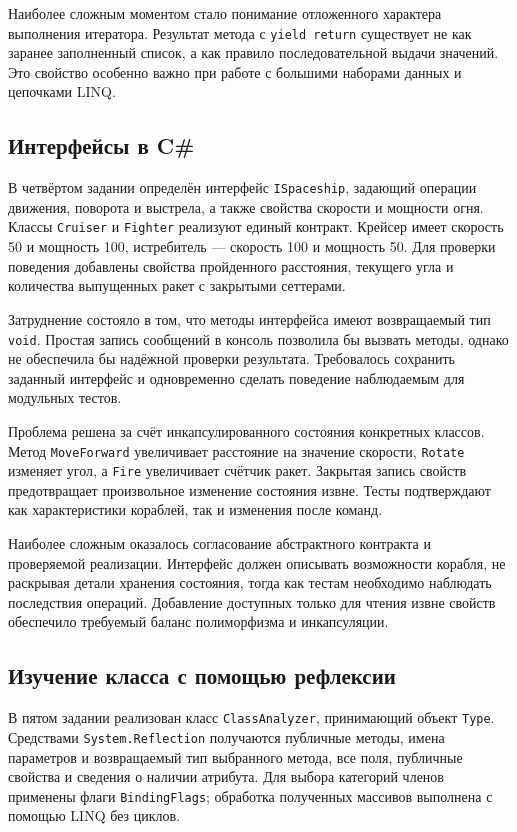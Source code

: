 Наиболее сложным моментом стало понимание отложенного характера выполнения итератора. Результат метода с \texttt{yield return} существует не как заранее заполненный список, а как правило последовательной выдачи значений. Это свойство особенно важно при работе с большими наборами данных и цепочками LINQ.

\subsection{Интерфейсы в C\#}

В четвёртом задании определён интерфейс \texttt{ISpaceship}, задающий операции движения, поворота и выстрела, а также свойства скорости и мощности огня. Классы \texttt{Cruiser} и \texttt{Fighter} реализуют единый контракт. Крейсер имеет скорость 50 и мощность 100, истребитель --- скорость 100 и мощность 50. Для проверки поведения добавлены свойства пройденного расстояния, текущего угла и количества выпущенных ракет с закрытыми сеттерами.

Затруднение состояло в том, что методы интерфейса имеют возвращаемый тип \texttt{void}. Простая запись сообщений в консоль позволила бы вызвать методы, однако не обеспечила бы надёжной проверки результата. Требовалось сохранить заданный интерфейс и одновременно сделать поведение наблюдаемым для модульных тестов.

Проблема решена за счёт инкапсулированного состояния конкретных классов. Метод \texttt{MoveForward} увеличивает расстояние на значение скорости, \texttt{Rotate} изменяет угол, а \texttt{Fire} увеличивает счётчик ракет. Закрытая запись свойств предотвращает произвольное изменение состояния извне. Тесты подтверждают как характеристики кораблей, так и изменения после команд.

Наиболее сложным оказалось согласование абстрактного контракта и проверяемой реализации. Интерфейс должен описывать возможности корабля, не раскрывая детали хранения состояния, тогда как тестам необходимо наблюдать последствия операций. Добавление доступных только для чтения извне свойств обеспечило требуемый баланс полиморфизма и инкапсуляции.

\subsection{Изучение класса с помощью рефлексии}

В пятом задании реализован класс \texttt{ClassAnalyzer}, принимающий объект \texttt{Type}. Средствами \texttt{System.Reflection} получаются публичные методы, имена параметров и возвращаемый тип выбранного метода, все поля, публичные свойства и сведения о наличии атрибута. Для выбора категорий членов применены флаги \texttt{BindingFlags}; обработка полученных массивов выполнена с помощью LINQ без циклов.

